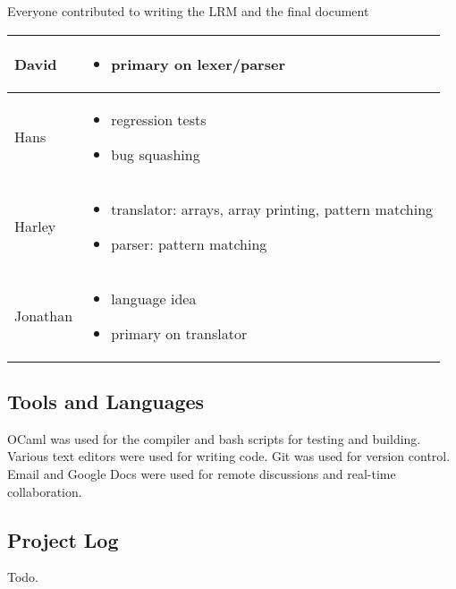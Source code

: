 Everyone contributed to writing the LRM and the final document
\begin{center}
\begin{tabular}{ | l | p{10cm} |}
\hline
David & \begin{itemize}
			\item primary on lexer/parser
		\end{itemize} \\ 
\hline
Hans & \begin{itemize}
			\item regression tests
			\item bug squashing
	   \end{itemize} \\
\hline
Harley & \begin{itemize}
			\item translator: arrays, array printing, pattern matching
			\item parser: pattern matching
		 \end{itemize} \\
\hline
Jonathan & \begin{itemize}
			\item language idea 
			\item primary on translator
		   \end{itemize}  \\
\hline
\end{tabular}
\end{center}

\subsection{Tools and Languages}
OCaml was used for the compiler and bash scripts for testing and building. Various text editors were used for writing code. Git was used for version control. Email and Google Docs were used for remote discussions and real-time collaboration.

\subsection{Project Log}
Todo.\\
